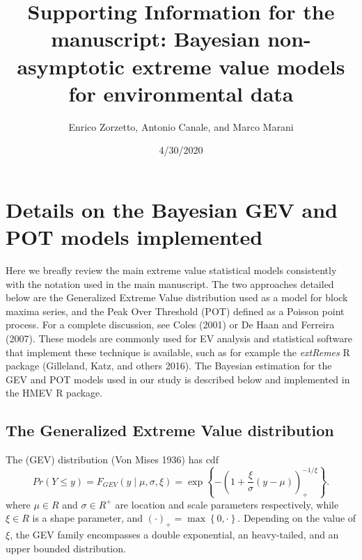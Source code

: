 \documentclass[]{article}
\title{Supporting Information for the manuscript: Bayesian non-asymptotic
extreme value models for environmental data}
\author{Enrico Zorzetto, Antonio Canale, and Marco Marani}
\date{4/30/2020}
\begin{document}
\maketitle

\renewcommand{\thefigure}{S\arabic{figure}}
 \renewcommand{\thetable}{S\arabic{table}}
 \renewcommand{\theequation}{S\arabic{equation}}

\hypertarget{details-on-the-bayesian-gev-and-pot-models-implemented}{%
\section{Details on the Bayesian GEV and POT models
implemented}\label{details-on-the-bayesian-gev-and-pot-models-implemented}}

Here we breafly review the main extreme value statistical models
consistently with the notation used in the main manuscript. The two
approaches detailed below are the Generalized Extreme Value distribution
used as a model for block maxima series, and the Peak Over Threshold
(POT) defined as a Poisson point process. For a complete discussion, see
Coles (2001) or De Haan and Ferreira (2007). These models are commonly
used for EV analysis and statistical software that implement these
technique is available, such as for example the \emph{extRemes} R
package (Gilleland, Katz, and others 2016). The Bayesian estimation for
the GEV and POT models used in our study is described below and
implemented in the HMEV R package.

\hypertarget{the-generalized-extreme-value-distribution}{%
\subsection{The Generalized Extreme Value
distribution}\label{the-generalized-extreme-value-distribution}}

The (GEV) distribution (Von Mises 1936) has cdf \begin{equation}
    Pr \left(Y \le y\right) =  F_{GEV} \left(y \mid \mu, \sigma, \xi \right) = \exp \left\{ -\left( 1 + \frac{\xi}{\sigma}\left( y - \mu \right)
    \right)_{+}^{-1/\xi} \right\}.
    \label{eq:gev}
\end{equation} where \(\mu \in R\) and \(\sigma \in R^{+}\) are location
and scale parameters respectively, while \(\xi \in R\) is a shape
parameter, and \((\cdot)_{+} = \max\left\{ 0, \cdot \right\}\).
Depending on the value of \(\xi\), the GEV family encompasses a double
exponential, an heavy-tailed, and an upper bounded distribution.
\end{document}
